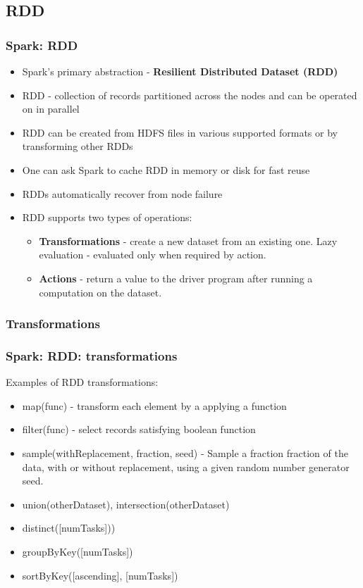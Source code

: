 \documentclass{beamer}
\begin{document}
\subsection{RDD}
\begin{frame}
 \frametitle{Spark: RDD}
 \begin{itemize}
  \item Spark's primary abstraction - {\color{mycolordef}\textbf{Resilient Distributed Dataset (RDD)}}
  \item RDD - collection of records partitioned across the nodes and can be operated on in parallel
  \item RDD can be created from HDFS files in various supported formats or by transforming other RDDs
  \item One can ask Spark to {\color{mycolordef}cache RDD in memory or disk} for fast reuse
  \item RDDs automatically recover from node failure
  \item RDD supports two types of operations:
    \begin{itemize}
      \item {\color{mycolordef}\textbf{Transformations}} - create a new dataset from an existing one. Lazy evaluation - evaluated only when required by action.
      \item {\color{mycolordef}\textbf{Actions}} - return a value to the driver program after running a computation on the dataset.
    \end{itemize}
 \end{itemize}
\end{frame}

\subsubsection{Transformations}
\begin{frame}
  \frametitle{Spark: RDD: transformations}
  Examples of RDD transformations:
  \begin{itemize}
  \item {\color{mycolorcode}map(func)} - transform each element by a applying a function
  \item {\color{mycolorcode}filter(func)} - select records satisfying boolean function
  \item {\color{mycolorcode}sample(withReplacement, fraction, seed)} - Sample a fraction fraction of the data, with or without replacement, using a given random number generator seed.
  \item {\color{mycolorcode}union(otherDataset), intersection(otherDataset)}
  \item {\color{mycolorcode}distinct([numTasks]))}
  \item {\color{mycolorcode}groupByKey([numTasks])}
  \item {\color{mycolorcode}sortByKey([ascending], [numTasks])}
  \end{itemize}
\end{frame}
\end{document}

